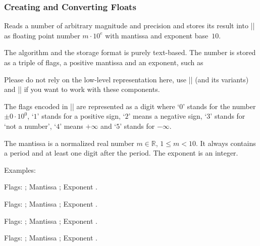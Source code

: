 \subsubsection{Creating and Converting Floats}
\begin{command}{\pgfmathfloatparsenumber{}}
	Reads a number of arbitrary magnitude and precision and stores its result into |\pgfmathresult| as floating point number $m \cdot 10^e$ with mantissa and exponent base~$10$.

	The algorithm and the storage format is purely text-based. The number is stored as a triple of flags, a positive mantissa and an exponent, such as
\begin{codeexample}[]
\pgfmathresult
\end{codeexample}
	Please do not rely on the low-level representation here, use |\pgfmathfloattomacro| (and its variants) and |\pgfmathfloatcreate| if you want to work with these components.

	The flags encoded in |\pgfmathresult| are represented as a digit where `$0$' stands for the number $\pm 0\cdot 10^0$, `$1$' stands for a positive sign, `$2$' means a negative sign, `$3$' stands for `not a number', `$4$' means $+\infty$ and `$5$' stands for $-\infty$.

	The mantissa is a normalized real number $m \in \mathbb{R}$, $1 \le m < 10$. It always contains a period and at least one digit after the period. The exponent is an integer.

	Examples:
\begin{codeexample}[]
\pgfmathfloattomacro{\pgfmathresult}{\F}{\M}{\E}
Flags: \F; Mantissa \M; Exponent \E.
\end{codeexample}

\begin{codeexample}[]
\pgfmathfloattomacro{\pgfmathresult}{\F}{\M}{\E}
Flags: \F; Mantissa \M; Exponent \E.
\end{codeexample}

\begin{codeexample}[]
\pgfmathfloattomacro{\pgfmathresult}{\F}{\M}{\E}
Flags: \F; Mantissa \M; Exponent \E.
\end{codeexample}

\begin{codeexample}[]
\pgfmathfloattomacro{\pgfmathresult}{\F}{\M}{\E}
Flags: \F; Mantissa \M; Exponent \E.
\end{codeexample}


\end{command}
